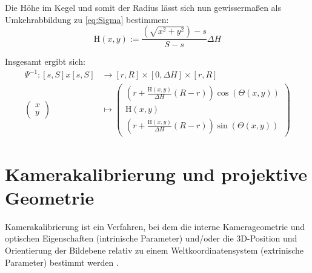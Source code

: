Die Höhe  im Kegel und somit der Radius lässt sich nun gewissermaßen als Umkehrabbildung zu \ref{eq:Sigma} bestimmen:
\begin{equation*}
\mathrm{H}(x,y) := \frac{\left(\sqrt{x^2+y^2}\right) - s}{S - s}\Delta H
\end{equation*}

Insgesamt ergibt sich:
\begin{equation}
\begin{aligned}
\Psi^{-1} \colon  [s,S]x[s,S] &\to [r,R] \times [0, \Delta H] \times [r,R]\\
\begin{pmatrix}
x \\ y
\end{pmatrix} &\mapsto
\begin{pmatrix}
\left( r + \frac{\mathrm{H}(x,y)}{\Delta H} (R - r)\right)\cos\left(\Theta(x,y) \right) \\
\mathrm{H}(x,y)\\
\left( r + \frac{\mathrm{H}(x,y)}{\Delta H} (R - r)\right)\sin\left(\Theta(x,y) \right)
\end{pmatrix}
\end{aligned}
\end{equation}




\section{Kamerakalibrierung und projektive Geometrie}
\label{s:calib}

\begin{definition}
	Kamerakalibrierung ist ein Verfahren, bei dem die interne Kamerageometrie und optischen Eigenschaften (intrinische Parameter) 
	und/oder die 3D-Position und Orientierung der Bildebene relativ zu einem Weltkoordinatensystem (extrinische Parameter) bestimmt werden \cite{Tsai1987}.
\end{definition}

